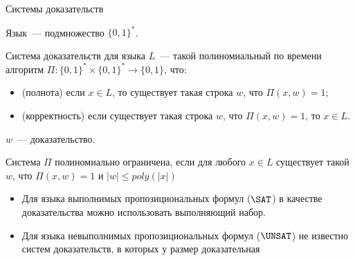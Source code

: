 \begin{frame}{Системы доказательств}

	Язык~--- подмножество $\{0, 1\}^*$.

    \begin{definition}
        Система доказательств для языка $L$~--- такой полиномиальный по времени алгоритм $\Pi: \{0,
        1\}^* \times \{0, 1\}^* \rightarrow \{0, 1\}$, что:
        \begin{itemize}
            \item (полнота) если $x \in L$, то существует такая строка $w$, что $\Pi(x, w) = 1$;
            \item (корректность) если существует такая строка $w$, что $\Pi(x, w) = 1$, то $x \in L$.
        \end{itemize}

        $w$~--- доказательство.
    \end{definition}

    \pause

    Система $\Pi$ полиномиально ограничена, если для любого $x \in L$ существует такой $w$, что $\Pi(x,
    w) = 1$ и $|w| \le poly(|x|)$

    \pause
    \begin{itemize}
        \item Для языка выполнимых пропозициональных формул ($\SAT$) в качестве доказательства можно
            использовать выполняющий набор.
        \pause
        \item Для языка невыполнимых пропозициональных формул ($\UNSAT$) не известно систем
            доказательств, в которых у размер доказательная 
    \end{itemize}
    
    
\end{frame}